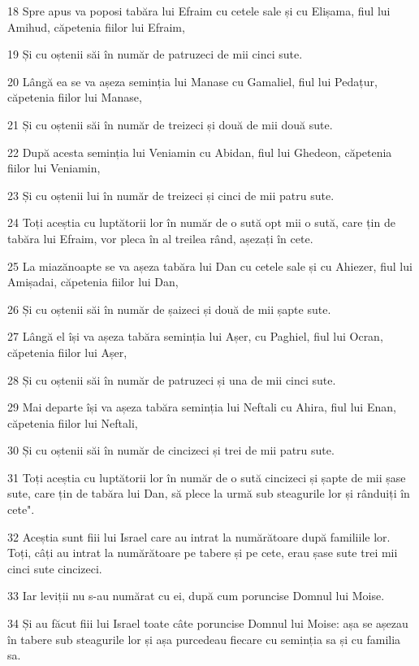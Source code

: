 \par 18 Spre apus va poposi tabăra lui Efraim cu cetele sale și cu Elișama, fiul lui Amihud, căpetenia fiilor lui Efraim,
\par 19 Și cu oștenii săi în număr de patruzeci de mii cinci sute.
\par 20 Lângă ea se va așeza seminția lui Manase cu Gamaliel, fiul lui Pedațur, căpetenia fiilor lui Manase,
\par 21 Și cu oștenii săi în număr de treizeci și două de mii două sute.
\par 22 După acesta seminția lui Veniamin cu Abidan, fiul lui Ghedeon, căpetenia fiilor lui Veniamin,
\par 23 Și cu oștenii lui în număr de treizeci și cinci de mii patru sute.
\par 24 Toți aceștia cu luptătorii lor în număr de o sută opt mii o sută, care țin de tabăra lui Efraim, vor pleca în al treilea rând, așezați în cete.
\par 25 La miazănoapte se va așeza tabăra lui Dan cu cetele sale și cu Ahiezer, fiul lui Amișadai, căpetenia fiilor lui Dan,
\par 26 Și cu oștenii săi în număr de șaizeci și două de mii șapte sute.
\par 27 Lângă el își va așeza tabăra seminția lui Așer, cu Paghiel, fiul lui Ocran, căpetenia fiilor lui Așer,
\par 28 Și cu oștenii săi în număr de patruzeci și una de mii cinci sute.
\par 29 Mai departe își va așeza tabăra seminția lui Neftali cu Ahira, fiul lui Enan, căpetenia fiilor lui Neftali,
\par 30 Și cu oștenii săi în număr de cincizeci și trei de mii patru sute.
\par 31 Toți aceștia cu luptătorii lor în număr de o sută cincizeci și șapte de mii șase sute, care țin de tabăra lui Dan, să plece la urmă sub steagurile lor și rânduiți în cete".
\par 32 Aceștia sunt fiii lui Israel care au intrat la numărătoare după familiile lor. Toți, câți au intrat la numărătoare pe tabere și pe cete, erau șase sute trei mii cinci sute cincizeci.
\par 33 Iar leviții nu s-au numărat cu ei, după cum poruncise Domnul lui Moise.
\par 34 Și au făcut fiii lui Israel toate câte poruncise Domnul lui Moise: așa se așezau în tabere sub steagurile lor și așa purcedeau fiecare cu seminția sa și cu familia sa.

